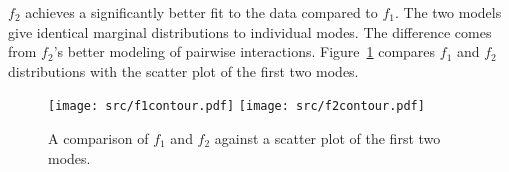 \documentclass[prl,nofootinbib,twocolumn,floatfix,showpacs]{revtex4}
\begin{document}

$f_2$ achieves a significantly better fit to the data compared to
$f_1$.  The two models give identical marginal distributions to
individual modes.  The difference comes from $f_2$'s better modeling
of pairwise interactions.  Figure~\ref{fig:contour} compares $f_1$ and
$f_2$ distributions with the scatter plot of the first two modes.

\begin{figure}[h]
  \texttt{[image: src/f1contour.pdf]}
  \texttt{[image: src/f2contour.pdf]}
\caption{A comparison of $f_1$ and $f_2$ against a scatter plot of the
  first two modes.}
\label{fig:contour}
\end{figure}





\end{document}
